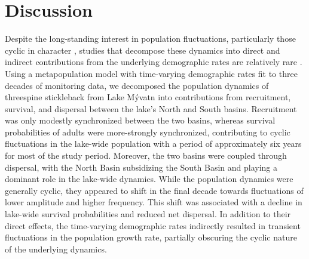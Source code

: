 \documentclass[11pt]{article}
\begin{document}



\section*{Discussion}

Despite the long-standing interest in population fluctuations,
particularly those cyclic in character 
\citep{elton1924, nicholson1935},
studies that decompose these dynamics into direct and indirect contributions 
from the underlying demographic rates are relatively rare 
\citep{fox2000population, coulson2005decomposing, koons2017understanding}.
Using a metapopulation model with time-varying demographic rates 
fit to three decades of monitoring data,
we decomposed the population dynamics of threespine stickleback from Lake M\'{y}vatn
into contributions from recruitment, survival, and dispersal 
between the lake's North and South basins.
Recruitment was only modestly synchronized between the two basins, 
whereas survival probabilities of adults were more-strongly synchronized, 
contributing to cyclic fluctuations in the lake-wide population with a period 
of approximately six years for most of the study period. 
Moreover, the two basins were coupled through dispersal, 
with the North Basin subsidizing the South Basin 
\citep[i.e., ``source-sink dynamics'';][]{pulliam1988}
and playing a dominant role in the lake-wide dynamics.
While the population dynamics were generally cyclic, 
they appeared to shift in the final decade towards fluctuations 
of lower amplitude and higher frequency. 
This shift was associated with a decline in lake-wide survival probabilities 
and reduced net dispersal. 
In addition to their direct effects, 
the time-varying demographic rates indirectly resulted in transient fluctuations 
in the population growth rate, 
partially obscuring the cyclic nature of the underlying dynamics. 
\end{document}
